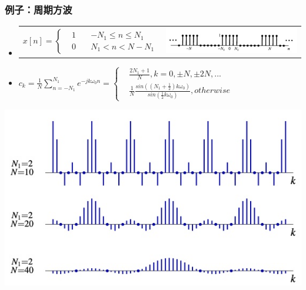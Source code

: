 \documentclass[CJKutf8,xcolor=pdftex,dvipsnames,table]{beamer}
\begin{document}
\begin{CJK*}{UTF8}{song}
    
  \begin{frame}
    \frametitle{例子：周期方波}
    \begin{itemize}
    
    \item
	\begin{tabular}{ll}
	\raisebox{-.5\height}

		\begin{math}
x[n] = 
\left\{
    \begin {aligned}
         & 1 \quad & -N_1 \leq n \leq N_1 \\
         & 0 \quad & N_1 < n < N - N_1                  
    \end{aligned}
\right.
		\end{math}  

&
    \includegraphics[valign=m,scale=.35]{ss-c-f3-16}    \\
    \end{tabular}  
    
    \item 
		\begin{math}
c_k = \frac{1}{N} \sum_{n=-N_1}^{N_1}e^{-jk\omega_0 n} =
\left\{
    \begin {aligned}
         & \frac{2N_1+1}{N}, k = 0, \pm N, \pm 2N, ... \\
         & \frac{1}{N} \frac{sin((N_1 + \frac{1}{2}) k\omega_0)}{sin(\frac{1}{2}k\omega_0)}, otherwise                 
    \end{aligned}
\right.
		\end{math} 		 
		
    \end{itemize}
    \begin{center}
      \includegraphics[scale=.4]{coefdtsquare}
    \end{center}    
  \end{frame} 
      

\end{CJK*}
\end{document}
